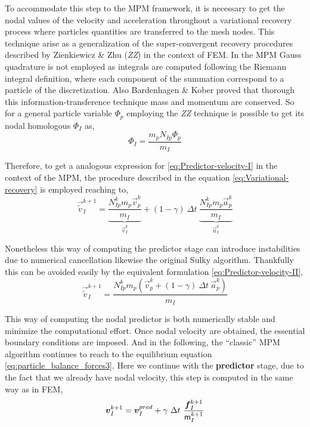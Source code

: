 To accommodate this step to the MPM framework, it is necessary to get the
nodal values of the velocity and acceleration throughout a variational
recovery process where particles quantities are transferred to the
mesh nodes. This technique arise as a generalization of the super-convergent recovery
procedures described by Zienkiewicz \& Zhu \cite{ZZ1992_I} (\textit{ZZ})
in the context of FEM. In the MPM Gauss quadrature is not employed as
integrals are computed following the Riemann integral definition,
where each component of the summation correspond to a particle of the
discretization. Also Bardenhagen \& Kober \cite{Bardenhagen2004}
proved that thorough this information-transference technique mass and momentum are conserved. So for a general particle variable $\Phi_p$ employing the
\textit{ZZ} technique is possible to get its nodal homologous $\Phi_I$  as,
\begin{equation}
  \label{eq:Variational-recovery}
   \Phi_I = \frac{m_p N_{Ip} \Phi_p}{m_I}
 \end{equation}

 Therefore, to get a analogous expression for
 \eqref{eq:Predictor-velocity-I} in the context of the MPM, the
 procedure described in the equation \eqref{eq:Variational-recovery}
 is employed reaching to,
 \begin{equation}
   \label{eq:Predictor-velocity-II}
   \vec{\tilde{v}}_I^{k+1} = \underbrace{\frac{N_{Ip}^{k} m_p
       \vec{v}_p^k}{m_I}}_{\vec{v}_I^{k}} + (1 - \gamma)\ \Delta t\  \underbrace{\frac{N_{Ip}^{k} m_p \vec{a}_p^k}{m_I}}_{\vec{a}_I^{k}}
 \end{equation}

Nonetheless this way of computing the predictor stage can introduce
instabilities due to numerical cancellation likewise the original
Sulky algorithm. Thankfully this can be avoided easily by the
equivalent formulation \eqref{eq:Predictor-velocity-II}, 
\begin{equation}
  \label{eq:Predictor-velocity-II}
  \vec{\tilde{v}}_I^{k+1} = \frac{ N_{Ip}^{k} m_p (\vec{v}_p^k + (1 - \gamma)\ \Delta t\ \vec{a}_p^k)}{m_I}
\end{equation}

This way of computing the nodal predictor is both numerically stable
and minimize the computational effort. Once nodal velocity are
obtained, the essential boundary conditions are imposed. And in the
following, the ``classic'' MPM algorithm continues to reach to the
equilibrium equation \eqref{eq:particle_balance_forces3}. Here we
continue with the \textbf{predictor} stage, due to the fact that we
already have nodal velocity, this step is computed in the same way as
in FEM,
\begin{equation}
  \label{eq:Corrector-velocity}
  \vec{v}_{I}^{k+1} = \vec{v}_{I}^{pred} + \gamma\ \Delta t\ \frac{\vec{f}_{I}^{k+1}}{\tens{m}_I^{k+1}}
\end{equation}

